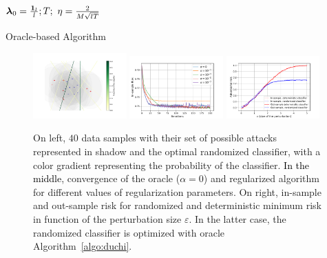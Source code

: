 \begin{algorithm}[ht]
\SetAlgoLined
 $\bm{\lambda}_0 = \frac{\mathbf{1}_l}{l}; T;~\textcolor{black}{\eta=\frac{2}{M\sqrt{lT}}}$\\
 \caption{Oracle-based Algorithm}
 \label{algo:duchi}
\end{algorithm}
\begin{figure}[!ht]
    \centering
    \includegraphics[width=0.32\textwidth]{Images/illustration.pdf}  \includegraphics[width=0.32\textwidth]{Images/convergence_toy.pdf}     \includegraphics[width=0.32\textwidth]{Images/risk_toy.pdf}
    \caption{On left, $40$ data samples with their set of possible attacks represented in shadow and the optimal randomized classifier, with a color gradient representing the probability of the classifier. \textcolor{black}{In the middle}, convergence of the oracle ($\alpha=0$) and regularized algorithm for different values of regularization parameters. On right, in-sample and out-sample risk for randomized and deterministic minimum risk in function of the perturbation size $\varepsilon$. In the latter case, the randomized classifier is optimized with oracle Algorithm~\ref{algo:duchi}.}
    \label{fig:toy_example}
\end{figure}


